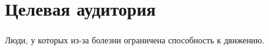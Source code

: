 \section{Целевая аудитория}

\begin{frame}
\frametitle{\insertsection} 
\framesubtitle{\insertsubsection}

Люди, у которых из-за болезни ограничена способность к движению.

\end{frame}